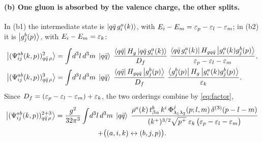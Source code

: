 \paragraph{(b) One gluon is absorbed by the valence charge, the other splits.}
\begin{center}
\hspace{0.5cm}
\end{center}
In (b1) the intermediate state is $\left|q\bar q\,g^{a}_{i}(k)\right\rangle$, with
$E_{i}-E_{m}=\varepsilon_{p}-\varepsilon_{l}-\varepsilon_{m}$; in (b2) it is $\left|g^{b}_{j}(p)\right\rangle$, with $E_{i}-E_{m}=\varepsilon_{k}$:
\begin{align}
\left|(\Psi^{ab}_{ij}(k,p))^{2}_{q\bar q\,\rho}\right\rangle&=\int\!d^{3}l\,d^{3}m\;\left|q\bar q\right\rangle\;
\frac{\left\langle q\bar q\right|H_{g}\left|q\bar q\,g^{a}_{i}(k)\right\rangle}{D_{f}}\;
\frac{\left\langle q\bar q\,g^{a}_{i}(k)\right|H_{gq\bar q}\left|g^{a}_{i}(k)g^{b}_{j}(p)\right\rangle}{\varepsilon_{p}-\varepsilon_{l}-\varepsilon_{m}},
\\
\left|(\Psi^{ab}_{ij}(k,p))^{3}_{q\bar q\,\rho}\right\rangle&=\int\!d^{3}l\,d^{3}m\;\left|q\bar q\right\rangle\;
\frac{\left\langle q\bar q\right|H_{gq\bar q}\left|g^{b}_{j}(p)\right\rangle}{D_{f}}\;
\frac{\left\langle g^{b}_{j}(p)\right|H_{g}\left|g^{a}_{i}(k)g^{b}_{j}(p)\right\rangle}{\varepsilon_{k}} .
\end{align}
Since $D_{f}=(\varepsilon_{p}-\varepsilon_{l}-\varepsilon_{m})+\varepsilon_{k}$, the two orderings combine by \eqref{eq:factor},
\begin{multline}
\left|(\Psi^{ab}_{ij}(k,p))^{2+3}_{q\bar q\,\rho}\right\rangle=\frac{g^{2}}{32\pi^{3}}\int\!d^{3}l\,d^{3}m\;
\left|q\bar q\right\rangle\;
\frac{\rho^{a}(k)\,t^{b}_{\beta\alpha}\,k^{i}\,\Phi^{j}_{\lambda_{1}\lambda_{2}}(p;l,m)\,\delta^{(3)}(p-l-m)}
{(k^{+})^{3/2}\sqrt{p^{+}}\;\varepsilon_{k}\,\big(\varepsilon_{p}-\varepsilon_{l}-\varepsilon_{m}\big)}\\
+\big((a,i,k)\leftrightarrow(b,j,p)\big) .
\label{eq:B1b}
\end{multline}

